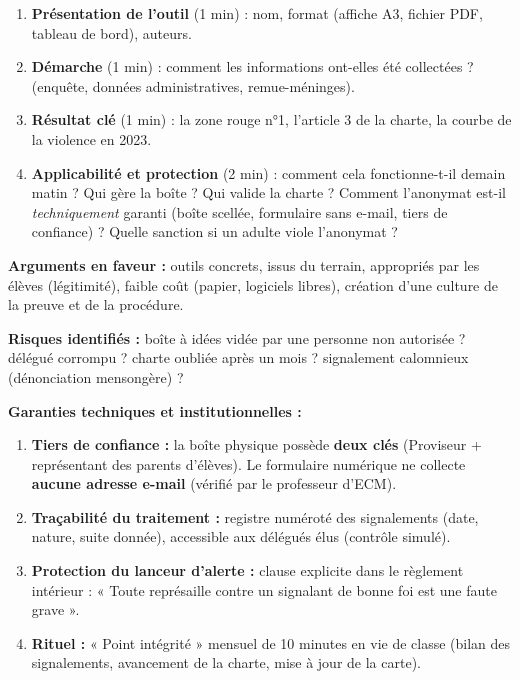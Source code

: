 \documentclass[11pt]{article}
\begin{document}
\begin{methode}
\begin{enumerate}
    \item \textbf{Présentation de l'outil} (1 min) : nom, format (affiche A3, fichier PDF, tableau de bord), auteurs.
    \item \textbf{Démarche} (1 min) : comment les informations ont-elles été collectées ? (enquête, données administratives, remue-méninges).
    \item \textbf{Résultat clé} (1 min) : la zone rouge n°1, l'article 3 de la charte, la courbe de la violence en 2023.
    \item \textbf{Applicabilité et protection} (2 min) : comment cela fonctionne-t-il demain matin ? Qui gère la boîte ? Qui valide la charte ? Comment l'anonymat est-il \emph{techniquement} garanti (boîte scellée, formulaire sans e-mail, tiers de confiance) ? Quelle sanction si un adulte viole l'anonymat ?
\end{enumerate}
\end{methode}

\begin{aretenir}
\textbf{Arguments en faveur :} outils concrets, issus du terrain, appropriés par les élèves (légitimité), faible coût (papier, logiciels libres), création d'une culture de la preuve et de la procédure.

\textbf{Risques identifiés :} boîte à idées vidée par une personne non autorisée ? délégué corrompu ? charte oubliée après un mois ? signalement calomnieux (dénonciation mensongère) ?

\textbf{Garanties techniques et institutionnelles :}
\begin{enumerate}
    \item \textbf{Tiers de confiance :} la boîte physique possède \textbf{deux clés} (Proviseur + représentant des parents d'élèves). Le formulaire numérique ne collecte \textbf{aucune adresse e-mail} (vérifié par le professeur d'ECM).
    \item \textbf{Traçabilité du traitement :} registre numéroté des signalements (date, nature, suite donnée), accessible aux délégués élus (contrôle simulé).
    \item \textbf{Protection du lanceur d'alerte :} clause explicite dans le règlement intérieur : « Toute représaille contre un signalant de bonne foi est une faute grave ».
    \item \textbf{Rituel :} « Point intégrité » mensuel de 10 minutes en vie de classe (bilan des signalements, avancement de la charte, mise à jour de la carte).
\end{enumerate}
\end{aretenir}
\end{document}
